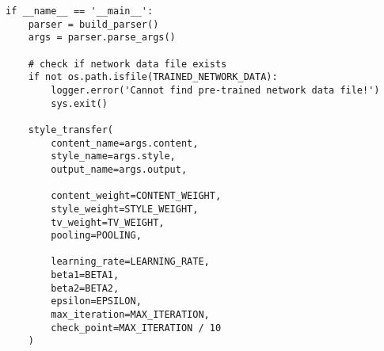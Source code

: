 \begin{spacing}{1}
\begin{lstlisting}
if __name__ == '__main__':
    parser = build_parser()
    args = parser.parse_args()

    # check if network data file exists
    if not os.path.isfile(TRAINED_NETWORK_DATA):
        logger.error('Cannot find pre-trained network data file!')
        sys.exit()

    style_transfer(
        content_name=args.content,
        style_name=args.style,
        output_name=args.output,

        content_weight=CONTENT_WEIGHT,
        style_weight=STYLE_WEIGHT,
        tv_weight=TV_WEIGHT,
        pooling=POOLING,

        learning_rate=LEARNING_RATE,
        beta1=BETA1,
        beta2=BETA2,
        epsilon=EPSILON,
        max_iteration=MAX_ITERATION,
        check_point=MAX_ITERATION / 10
    )

\end{lstlisting}
\end{spacing}



